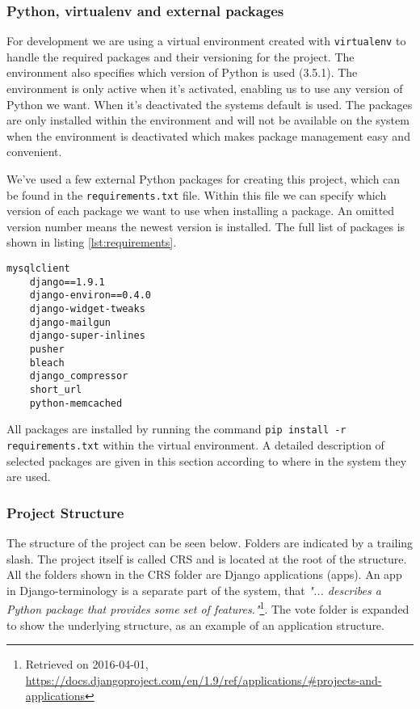 \subsubsection*{Python, virtualenv and external packages}
For development we are using a virtual environment created with \texttt{virtualenv} to handle the required packages and their versioning for the project. The environment also specifies which version of Python is used (3.5.1). The environment is only active when it's activated, enabling us to use any version of Python we want. When it's deactivated the systems default is used. The packages are only installed within the environment and will not be available on the system when the environment is deactivated which makes package management easy and convenient.

We've used a few external Python packages for creating this project, which can be found in the \texttt{requirements.txt} file. Within this file we can specify which version of each package we want to use when installing a package. An omitted version number means the newest version is installed. The full list of packages is shown in listing \ref{lst:requirements}.

\begin{lstlisting}[caption=The requirements.txt file. , label=lst:requirements]
    mysqlclient
    django==1.9.1
    django-environ==0.4.0
    django-widget-tweaks
    django-mailgun
    django-super-inlines
    pusher
    bleach
    django_compressor
    short_url
    python-memcached
\end{lstlisting}

All packages are installed by running the command \texttt{pip install -r requirements.txt} within the virtual environment. A detailed description of selected packages are given in this section according to where in the system they are used.

\subsubsection*{Project Structure}
The structure of the project can be seen below. Folders are indicated by a trailing slash. The project itself is called CRS and is located at the root of the structure. All the folders shown in the CRS folder are Django applications (apps). An app in Django-terminology is a separate part of the system, that \emph{"... describes a Python package that provides some set of features."}\footnote{Retrieved on 2016-04-01, \url{https://docs.djangoproject.com/en/1.9/ref/applications/\#projects-and-applications}}. The vote folder is expanded to show the underlying structure, as an example of an application structure.

